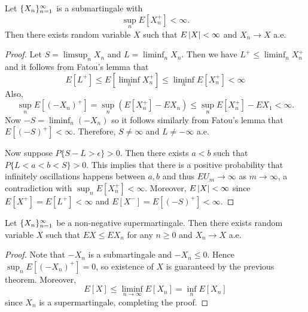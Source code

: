 \documentclass[a4paper]{article}
\begin{document}
\begin{thm}
  Let $\{ X_n \}_{n=1}^\infty$ is a submartingale with 
  \[
    \sup_n E[X_n^+] < \infty.
  \]
  Then there exists random variable $X$ such that
  $E \left\lvert X\right\rvert < \infty$ and $X_n \to X$ a.e.
\end{thm}

\begin{proof}
  Let $S = \limsup_n X_n$ and $L = \liminf_n X_n$.
  Then we have $L^+ \leq \liminf_n X_n^+$ and it follows from 
  Fatou's lemma that
  \[
  E [L^+] \leq E[\liminf_n X_n^+] \leq \liminf_n E[X_n^+] < \infty
  \]
  Also,
  \[
  \sup_n E[(-X_n)^+] = \sup_n \left( E [X_n^+] - E X_n \right)
  \leq \sup_n E[X_n^+] - E X_1
  < \infty.
  \]
  Now $-S = \liminf_n (- X_n)$ so it follows similarly from 
  Fatou's lemma that $E [(- S)^+] < \infty$. Therefore, 
  $S \neq \infty$ and $L \neq - \infty$ a.e.

  Now suppose $P \{ S - L > \epsilon \} > 0$.
  Then there exists $a < b$ such that $P \{ L < a < b < 
  S \} > 0$. This implies that there is a positive probability 
  that infinitely oscillations happens between $a, b$ and thus 
  $E U_m \to \infty$ as $m \to \infty$, a 
  contradiction with $\sup_n E[X_n^+] < \infty$. Moreover,
  $E \left\lvert X\right\rvert < \infty$ since $E [X^+] = E [L^+] < \infty$
  and $E [X^-] = E [(-S)^+] < \infty$.

\end{proof}

\begin{cor}
  Let $\{ X_n \}_{n=1}^\infty$ be a non-negative supermartingale. 
  Then there exists random variable $X$ such that 
  $E X \leq E X_n$ for any $n \geq 0$ and $X_n \to X$ a.e.
\end{cor}

\begin{proof}
  Note that $-X_n$ is a submartingale and $-X_n \leq 0$.
  Hence $\sup_n E [(-X_n)^+] = 0$, so existence of $X$ is guaranteed
  by the previous theorem. Moreover, 
  \[
  E[X] \leq \liminf_{n \to \infty} E[X_n] = \inf_n E[X_n]
  \]
  since $X_n$ is a supermartingale, completing the proof.

\end{proof}
\end{document}
